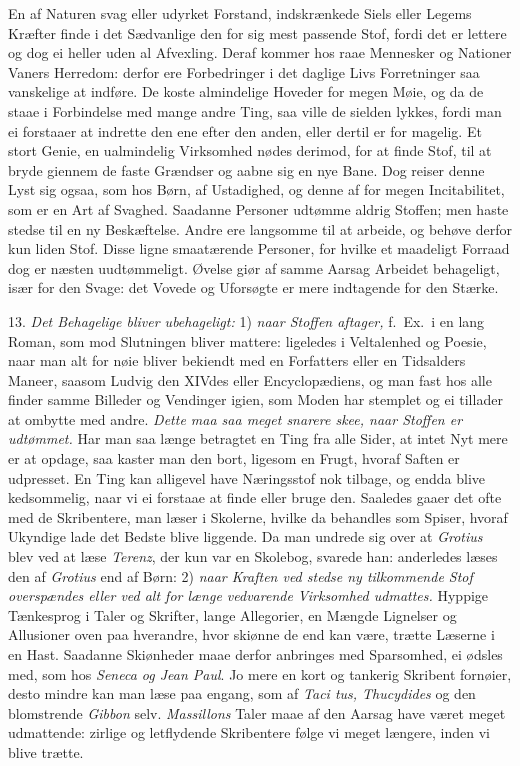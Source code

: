 \documentclass[12pt,a4paper]{article}
\newcommand{\opage}[1]{\marginnote{\footnotesize\textit{[#1]}}}
\begin{document}
\opage{212} En af Naturen svag eller udyrket Forstand, indskrænkede Siels eller Legems Kræfter finde i
det Sædvanlige den for sig mest passende Stof, fordi det er lettere og dog ei heller uden
al Afvexling. Deraf kommer hos raae Mennesker og Nationer Vaners Herredom: derfor ere
Forbedringer i det daglige Livs Forretninger saa vanskelige at indføre. De koste
almindelige Hoveder for megen Møie, og da de staae i Forbindelse med mange andre Ting, saa
ville de sielden lykkes, fordi man ei forstaaer at indrette den ene efter den anden, eller
dertil er for magelig. Et stort Genie, en ualmindelig Virksomhed nødes derimod, for at
finde Stof, til at bryde giennem de faste Grændser og aabne sig en nye Bane. Dog reiser
denne Lyst sig ogsaa, som hos Børn, af Ustadighed, og denne af for megen Incitabilitet, som
er en Art af Svaghed. Saadanne Personer udtømme aldrig Stoffen; men haste stedse til en ny
Beskæftelse. Andre ere langsomme til at arbeide, og behøve derfor kun liden Stof. Disse
ligne smaatærende Personer, for hvilke et maadeligt Forraad dog er næsten uudtømmeligt.
Øvelse giør af samme Aarsag Arbeidet behageligt, især for den Svage: det Vovede og
Uforsøgte er mere indtagende for den Stærke.

13. \emph{Det Behagelige bliver ubehageligt:} 1) \emph{naar Stoffen aftager,} f.~Ex.\ i en
lang Roman, som mod Slutningen bliver mattere: ligeledes i Veltalenhed og Poesie, naar man
alt for nøie
\opage{213} bliver bekiendt med en Forfatters eller en Tidsalders Maneer, saasom Ludvig den XIVdes
eller Encyclopædiens, og man fast hos alle finder samme Billeder og Vendinger igien, som
Moden har stemplet og ei tillader at ombytte med andre. \emph{Dette maa saa meget snarere
skee, naar Stoffen er udtømmet.} Har man saa længe betragtet en Ting fra alle Sider, at
intet Nyt mere er at opdage, saa kaster man den bort, ligesom en Frugt, hvoraf Saften er
udpresset. En Ting kan alligevel have Næringsstof nok tilbage, og endda blive kedsommelig,
naar vi ei forstaae at finde eller bruge den. Saaledes gaaer det ofte med de Skribentere,
man læser i Skolerne, hvilke da behandles som Spiser, hvoraf Ukyndige lade det Bedste blive
liggende. Da man undrede sig over at \emph{Grotius} blev ved at læse \emph{Terenz}, der kun
var en Skolebog, svarede han: anderledes læses den af \emph{Grotius} end af Børn: 2)
\emph{naar Kraften ved stedse ny tilkommende Stof overspændes eller ved alt for længe
vedvarende Virksomhed udmattes.} Hyppige Tænkesprog i Taler og Skrifter, lange Allegorier,
en Mængde Lignelser og Allusioner oven paa hverandre, hvor skiønne de end kan være, trætte
Læserne i en Hast. Saadanne Skiønheder maae derfor anbringes med Sparsomhed, ei ødsles med,
som hos \emph{Seneca og Jean Paul}. Jo mere en kort og tankerig Skribent fornøier, desto
mindre kan man læse paa engang, som af \emph{Taci%
\opage{214}tus, Thucydides} og den blomstrende \emph{Gibbon} selv. \emph{Massillons} Taler maae af den
Aarsag have været meget udmattende: zirlige og letflydende Skribentere følge vi meget
længere, inden vi blive trætte.
\end{document}
